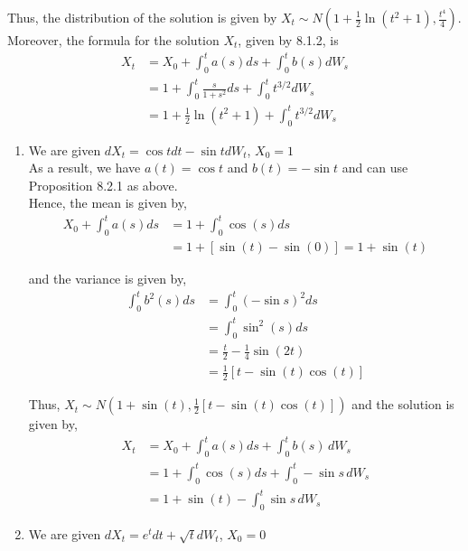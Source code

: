 \documentclass[12pt]{article}
\newenvironment{problem}[2][Problem]{\begin{trivlist}
\item[\hskip \labelsep {\bfseries #1}\hskip \labelsep {\bfseries #2.}]}{\end{trivlist}}
\begin{document}
Thus, the distribution of the solution is given by $X_t \sim N(1 + \frac{1}{2}\ln(t^2+1), \frac{t^4}{4})$.\\

Moreover, the formula for the solution $X_t$, given by 8.1.2, is
\begin{align*}
X_t &= X_0 + \int_0^t a(s) ds + \int_0^t b(s) dW_s\\
&= 1 + \int_0^t \frac{s}{1 + s^2} ds + \int_0^t t^{3/2} dW_s\\
&= 1 + \frac{1}{2}\ln(t^2+1) + \int_0^t t^{3/2} dW_s
\end{align*}

\begin{problem}{25}
\end{problem}

\begin{enumerate}[\alph*)]

\item We are given $dX_t = \cos t dt - \sin t dW_t$, $X_0 = 1$\\

As a result, we have $a(t) = \cos t$ and $b(t) = - \sin t$ and can use Proposition 8.2.1 as above.\\

Hence, the mean is given by,
\begin{align*}
X_0 + \int_0^t a(s) ds &= 1 + \int_0^t \cos(s) ds\\
&= 1 + [\sin(t) - \sin(0)] = 1 + \sin(t)
\end{align*}

and the variance is given by,
\begin{align*}
\int_0^t b^2(s) ds &= \int_0^t \left(-\sin s\right)^2 ds\\
&= \int_0^t \sin^2(s) ds\\
&= \frac{t}{2} - \frac{1}{4}\sin(2t)\\
&= \frac{1}{2}\left[t - \sin(t)\cos(t)\right]
\end{align*}

Thus, $X_t \sim N\left(1 + \sin(t), \frac{1}{2}\left[t - \sin(t)\cos(t)\right]\right)$ and the solution is given by,
\begin{align*}
X_t &= X_0 + \int_0^t a(s) ds + \int_0^t b(s) \, dW_s\\
&= 1 + \int_0^t \cos(s) ds + \int_0^t -\sin s \, dW_s\\
&= 1 + \sin(t) - \int_0^t \sin s \, dW_s
\end{align*}

\item We are given $dX_t = e^t dt + \sqrt{t} dW_t$, $X_0 = 0$\\


\end{enumerate}
\end{document}
